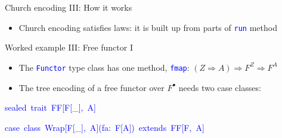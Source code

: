 \documentclass[english,,russian]{beamer}
\newenvironment{lyxcode}
  {\par\begin{list}{}{
    \setlength{\rightmargin}{\leftmargin}
    \setlength{\listparindent}{0pt}%
    \raggedright
    \setlength{\itemsep}{0pt}
    \setlength{\parsep}{0pt}
    \normalfont\ttfamily}%
   \def\{{\char`\{}
   \def\}{\char`\}}
   \def\textasciitilde{\char`\~}
   \item[]}
  {\end{list}}
\begin{document}
\begin{frame}{Church encoding III: How it works}
\begin{itemize}
\begin{itemize}
and \texttt{\textcolor{blue}{\footnotesize{}Id}} 
\begin{itemize}
\item Naturality of \texttt{\textcolor{blue}{\footnotesize{}ch.run}} follows
from parametricity of its code
\end{itemize}
\item It is straightforward to compute \texttt{\textcolor{blue}{\footnotesize{}c2a(a2c(a))
= identity(a) = a}} 
\end{itemize}
\item Church encoding satisfies laws: it is built up from parts of \texttt{\textcolor{blue}{\footnotesize{}run}}
method
\end{itemize}
\end{frame}

\begin{frame}{Worked example III: Free functor I}
\begin{itemize}
\item The \texttt{\textcolor{blue}{\footnotesize{}Functor}} type class has
one method, \texttt{\textcolor{blue}{\footnotesize{}fmap}}: $\left(Z\Rightarrow A\right)\Rightarrow F^{Z}\Rightarrow F^{A}$ 
\item The tree encoding of a free functor over $F^{\bullet}$ needs two
case classes:
\end{itemize}
\begin{lyxcode}
\textcolor{blue}{\footnotesize{}sealed~trait~FF{[}F{[}\_{]},~A{]}}{\footnotesize\par}

\textcolor{blue}{\footnotesize{}case~class~Wrap{[}F{[}\_{]},~A{]}(fa:~F{[}A{]})~extends~FF{[}F,~A{]}}{\footnotesize\par}


\end{lyxcode}
\end{frame}
\end{document}
